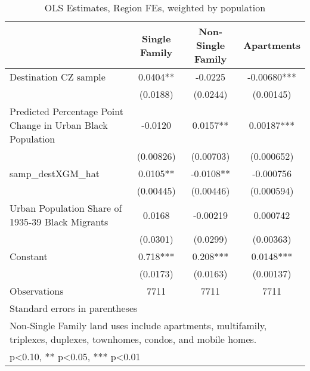 \begin{table}[htbp]\centering
\def\sym#1{\ifmmode^{#1}\else\(^{#1}\)\fi}
\caption{OLS Estimates, Region FEs, weighted by population}
\begin{tabular}{l*{3}{c}}
\toprule
                    &\multicolumn{1}{c}{Single Family}&\multicolumn{1}{c}{Non-Single Family}&\multicolumn{1}{c}{Apartments}\\
\midrule
Destination CZ sample&      0.0404** &     -0.0225   &    -0.00680***\\
                    &    (0.0188)   &    (0.0244)   &   (0.00145)   \\
\addlinespace
Predicted Percentage Point Change in Urban Black Population&     -0.0120   &      0.0157** &     0.00187***\\
                    &   (0.00826)   &   (0.00703)   &  (0.000652)   \\
\addlinespace
samp\_destXGM\_hat    &      0.0105** &     -0.0108** &   -0.000756   \\
                    &   (0.00445)   &   (0.00446)   &  (0.000594)   \\
\addlinespace
Urban Population Share of 1935-39 Black Migrants&      0.0168   &    -0.00219   &    0.000742   \\
                    &    (0.0301)   &    (0.0299)   &   (0.00363)   \\
\addlinespace
Constant            &       0.718***&       0.208***&      0.0148***\\
                    &    (0.0173)   &    (0.0163)   &   (0.00137)   \\
\midrule
Observations        &        7711   &        7711   &        7711   \\
\bottomrule
\multicolumn{4}{l}{\footnotesize Standard errors in parentheses}\\
\multicolumn{4}{l}{\footnotesize Non-Single Family land uses include apartments, multifamily, triplexes, duplexes, townhomes, condos, and mobile homes.}\\
\multicolumn{4}{l}{\footnotesize * p<0.10, ** p<0.05, *** p<0.01}\\
\end{tabular}
\end{table}
